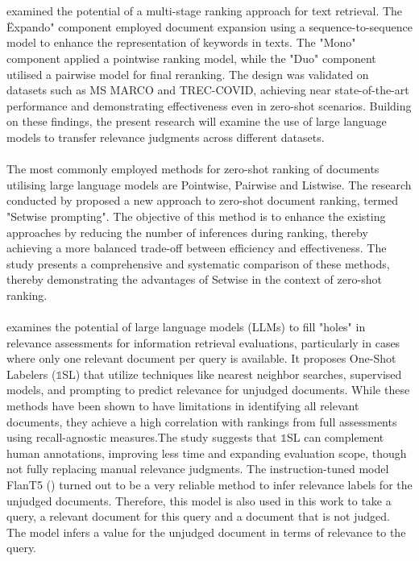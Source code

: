 \\\\
\citet{pradeep:2021} examined the potential of a multi-stage ranking approach for text retrieval. The \"Expando" component employed document expansion using a sequence-to-sequence model to enhance the representation of keywords in texts. The "Mono" component applied a pointwise ranking model, while the "Duo" component utilised a pairwise model for final reranking. The design was validated on datasets such as MS MARCO and TREC-COVID, achieving near state-of-the-art performance and demonstrating effectiveness even in zero-shot scenarios. Building on these findings, the present research will examine the use of large language models to transfer relevance judgments across different datasets.
\\\\
The most commonly employed methods for zero-shot ranking of documents utilising large language models are Pointwise, Pairwise and Listwise. The research conducted by \citet{zhuang:2024} proposed a new approach to zero-shot document ranking, termed "Setwise prompting". The objective of this method is to enhance the existing approaches by reducing the number of inferences during ranking, thereby achieving a more balanced trade-off between efficiency and effectiveness. The study presents a comprehensive and systematic comparison of these methods, thereby demonstrating the advantages of Setwise in the context of zero-shot ranking.
\\\\
\cite{macavaney:2023} examines the potential of large language models (LLMs) to fill "holes" in relevance assessments for information retrieval evaluations, particularly in cases where only one relevant document per query is available. It proposes One-Shot Labelers ($\mathbb{1}$SL) that utilize techniques like nearest neighbor searches, supervised models, and prompting to predict relevance for unjudged documents. While these methods have been shown to have limitations in identifying all relevant documents, they achieve a high correlation with rankings from full assessments using recall-agnostic measures.The study suggests that $\mathbb{1}$SL can complement human annotations, improving less time and expanding evaluation scope, though not fully replacing manual relevance judgments. The instruction-tuned model FlanT5 (\citet{chung:2022}) turned out to be a very reliable method to infer relevance labels for the unjudged documents. Therefore, this model is also used in this work to take a query, a relevant document for this query and a document that is not judged. The model infers a value for the unjudged document in terms of relevance to the query.
